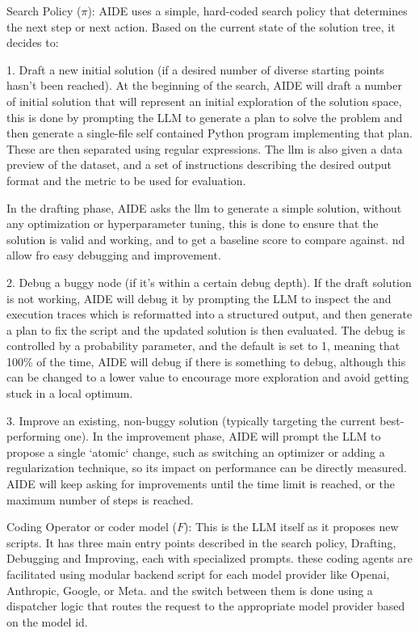 Search Policy ($\pi$): AIDE uses a simple, hard-coded search policy that determines the next step or next action. Based on the current state of the solution tree, it decides to:

1. Draft a new initial solution (if a desired number of diverse starting points hasn't been reached).
At the beginning of the search, AIDE will draft a number of initial solution that will represent an initial exploration of the solution space, this is done by prompting the LLM to generate a plan to solve the problem and then generate a single-file self contained Python program implementing that plan. These are then separated using regular expressions. The llm is also given a data preview of the dataset, and a set of instructions describing the desired output format and the metric to be used for evaluation.

In the drafting phase, AIDE asks the llm to generate a simple solution, without any optimization or hyperparameter tuning, this is done to ensure that the solution is valid and working, and to get a baseline score to compare against. nd allow fro easy debugging and improvement.

2. Debug a buggy node (if it's within a certain debug depth).
If the draft solution is not working, AIDE will debug it by prompting the LLM to inspect the and execution traces which is reformatted into a structured output, and then generate a plan to fix the script and the updated solution is then evaluated.
The debug is controlled by a probability parameter, and the default is set to 1, meaning that 100\% of the time, AIDE will debug if there is something to debug, although this can be changed to a lower value to encourage more exploration and avoid getting stuck in a local optimum.

3. Improve an existing, non-buggy solution (typically targeting the current best-performing one).
In the improvement phase, AIDE will prompt the LLM to propose a single `atomic` change, such as switching an optimizer or adding a regularization technique, so its impact on performance can be directly measured. AIDE will keep asking for improvements until the time limit is reached, or the maximum number of steps is reached.

Coding Operator or coder model ($F$): This is the LLM itself as it proposes new scripts. It has three main entry points described in the search policy, Drafting, Debugging and Improving, each with specialized prompts. these coding agents are facilitated using modular backend script for each model provider like Openai, Anthropic, Google, or Meta. and the switch between them is done using a dispatcher logic that routes the request to the appropriate model provider based on the model id.

